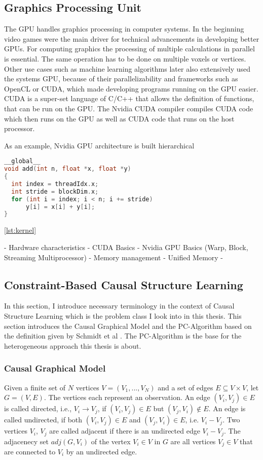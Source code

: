 \subsection{Graphics Processing Unit}
The GPU handles graphics processing in computer systems. In the beginning video games were the main driver for technical advancements in developing better GPUs. For computing graphics the processing of multiple calculations in parallel is essential. The same operation has to be done on multiple voxels or vertices. Other use cases such as machine learning algorithms later also extensively used the systems GPU, because of their parallelizability and frameworks such as OpenCL or CUDA, which made developing programs running on the GPU easier.
CUDA is a super-set language of C/C++ that allows the definition of functions, that can be run on the GPU. The Nvidia CUDA compiler compiles CUDA code which then runs on the GPU as well as CUDA code that runs on the host processor.

As an example, Nvidia GPU architecture is built hierarchical 
\begin{lstlisting}[language=C++, caption=Cuda kernel example, label=lst:kernel]
__global__
void add(int n, float *x, float *y)
{
  int index = threadIdx.x;
  int stride = blockDim.x;
  for (int i = index; i < n; i += stride)
      y[i] = x[i] + y[i];
}
\end{lstlisting}

\ref{lst:kernel}

- Hardware characteristics
- CUDA Basics
- Nvidia GPU Basics (Warp, Block, Streaming Multiprocessor)
- Memory management
- Unified Memory
- 

\subsection{Constraint-Based Causal Structure Learning}
In this section, I introduce necessary terminology in the context of Causal Structure Learning which is the problem class I look into in this thesis. This section introduces the Causal Graphical Model and the PC-Algorithm based on the definition given by Schmidt et al \cite{schmidt_order-independent_2018}. The PC-Algorithm is the base for the heterogeneous approach this thesis is about.

\subsubsection{Causal Graphical Model}
Given a finite set of $N$ vertices $V = (V_1,...,V_N)$ and a set of edges $E \subseteq V \times V$, let $G = (V,E)$. The vertices each represent an observation. An edge $(V_i, V_j) \in E$ is called directed, i.e., $V_i \rightarrow V_j$, if $(V_i,V_j) \in E$ but $(V_j, V_i) \notin E$. An edge is called undirected, if both $(V_i,V_j) \in E$ and $(V_j, V_i) \in E$, i.e. $V_i - V_j$. Two vertices $V_i$, $V_j$ are called adjacent if there is an undirected edge $V_i - V_j$. The adjacenecy set $adj(G, V_i)$ of the vertex $V_i \in V$ in $G$ are all vertices $V_j \in V$ that are connected to $V_i$ by an undirected edge.

